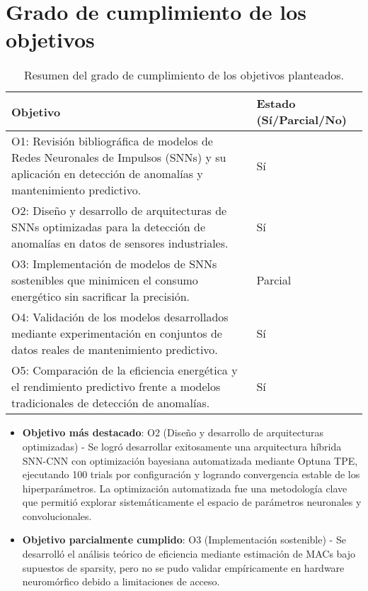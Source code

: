 \section{Grado de cumplimiento de los objetivos}
\begin{table}[htbp]
    \centering
    \small
    \begin{tabular}{p{}p{}}
        \hline\hline
        \textbf{Objetivo} & \textbf{Estado (Sí/Parcial/No)} \\
        \hline
        O1: Revisión bibliográfica de modelos de Redes Neuronales de Impulsos (SNNs) y su aplicación en detección de anomalías y mantenimiento predictivo. & Sí \\
        O2: Diseño y desarrollo de arquitecturas de SNNs optimizadas para la detección de anomalías en datos de sensores industriales. & Sí \\
        O3: Implementación de modelos de SNNs sostenibles que minimicen el consumo energético sin sacrificar la precisión. & Parcial \\
        O4: Validación de los modelos desarrollados mediante experimentación en conjuntos de datos reales de mantenimiento predictivo. & Sí \\
        O5: Comparación de la eficiencia energética y el rendimiento predictivo frente a modelos tradicionales de detección de anomalías. & Sí \\ 
        \hline\hline
    \end{tabular}
    \caption{Resumen del grado de cumplimiento de los objetivos planteados.}
    \label{tab:objetivos-cumplimiento}
\end{table}


\begin{itemize}
    \item \textbf{Objetivo más destacado}: O2 (Diseño y desarrollo de arquitecturas optimizadas) - Se logró desarrollar exitosamente una arquitectura híbrida SNN-CNN con optimización bayesiana automatizada mediante Optuna TPE, ejecutando 100 trials por configuración y logrando convergencia estable de los hiperparámetros. La optimización automatizada fue una metodología clave que permitió explorar sistemáticamente el espacio de parámetros neuronales y convolucionales.
    \item \textbf{Objetivo parcialmente cumplido}: O3 (Implementación sostenible) - Se desarrolló el análisis teórico de eficiencia mediante estimación de MACs bajo supuestos de sparsity, pero no se pudo validar empíricamente en hardware neuromórfico debido a limitaciones de acceso.
\end{itemize}


